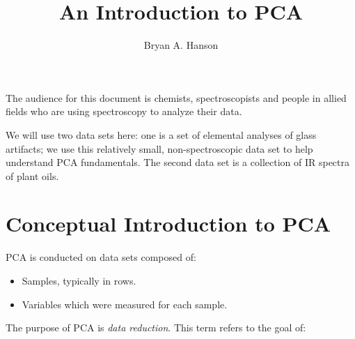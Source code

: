 \documentclass[10pt,twocolumn,twoside,]{pinp}
\title{An Introduction to PCA}
\author[a]{Bryan A. Hanson}
\affil[a]{Prof.~Emeritus, Dept. of Chemistry \& Biochemistry, DePauw
University; \url{hanson@depauw.edu}}
\providecommand{\tightlist}{%
  \setlength{\itemsep}{0pt}\setlength{\parskip}{0pt}}
\begin{document}
\verticaladjustment{-2pt}

\maketitle
\thispagestyle{firststyle}



The audience for this document is chemists, spectroscopists and people
in allied fields who are using spectroscopy to analyze their data.

We will use two data sets here: one is a set of elemental analyses of
glass artifacts; we use this relatively small, non-spectroscopic data
set to help understand PCA fundamentals. The second data set is a
collection of IR spectra of plant oils.

\hypertarget{conceptual-introduction-to-pca}{%
\section{Conceptual Introduction to
PCA}\label{conceptual-introduction-to-pca}}

PCA is conducted on data sets composed of:

\begin{itemize}
\tightlist
\item
  Samples, typically in rows.
\item
  Variables which were measured for each sample.
\end{itemize}

The purpose of PCA is \emph{data reduction}. This term refers to the
goal of:
\end{document}
